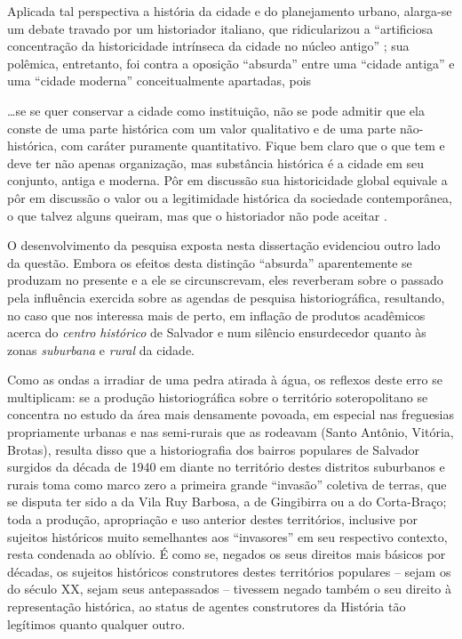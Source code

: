 Aplicada tal perspectiva a história da cidade e do planejamento urbano, alarga-se um debate travado por um historiador italiano, que ridicularizou a ``artificiosa concentração da historicidade intrínseca da cidade no núcleo antigo'' \cite[p.~74]{argan_histcid_1992}; sua polêmica, entretanto, foi contra a oposição ``absurda'' entre uma ``cidade antiga'' e uma ``cidade moderna'' conceitualmente apartadas, pois 

\begin{citacao}
\dots se se quer conservar a cidade como instituição, não se pode admitir que ela conste de uma parte histórica com um valor qualitativo e de uma parte não-histórica, com caráter puramente quantitativo. Fique bem claro que o que tem e deve ter não apenas organização, mas substância histórica é a cidade em seu conjunto, antiga e moderna. Pôr em discussão sua historicidade global equivale a pôr em discussão o valor ou a legitimidade histórica da sociedade contemporânea, o que talvez alguns queiram, mas que o historiador não pode aceitar \cite[p.~79]{argan_histcid_1992}.
\end{citacao}

O desenvolvimento da pesquisa exposta nesta dissertação evidenciou outro lado da questão. Embora os efeitos desta distinção ``absurda'' aparentemente se produzam no presente e a ele se circunscrevam, eles reverberam sobre o passado pela influência exercida sobre as agendas de pesquisa historiográfica, resultando, no caso que nos interessa mais de perto, em inflação de produtos acadêmicos acerca do \textit{centro histórico} de Salvador e num silêncio ensurdecedor quanto às zonas \textit{suburbana} e \textit{rural} da cidade. 

Como as ondas a irradiar de uma pedra atirada à água, os reflexos deste erro se multiplicam: se a produção historiográfica sobre o território soteropolitano se concentra no estudo da área mais densamente povoada, em especial nas freguesias propriamente urbanas e nas semi-rurais que as rodeavam (Santo Antônio, Vitória, Brotas), resulta disso que a historiografia dos bairros populares de Salvador surgidos da década de 1940 em diante no território destes distritos suburbanos e rurais toma como marco zero a primeira grande ``invasão'' coletiva de terras, que se disputa ter sido a da Vila Ruy Barbosa, a de Gingibirra ou a do Corta-Braço; toda a produção, apropriação e uso anterior destes territórios, inclusive por sujeitos históricos muito semelhantes aos ``invasores'' em seu respectivo contexto, resta condenada ao oblívio. É como se, negados os seus direitos mais básicos por décadas, os sujeitos históricos construtores destes territórios populares -- sejam os do século XX, sejam seus antepassados --  tivessem negado também o seu direito à representação histórica, ao status de agentes construtores da História tão legítimos quanto qualquer outro.

